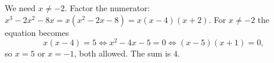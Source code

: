 We need $x\ne-2$. Factor the numerator: $x^3-2x^2-8x=x\left(x^2-2x-8\right)=x(x-4)(x+2)$. For $x\ne-2$ the equation becomes
\[x(x-4)=5\iff x^2-4x-5=0\iff(x-5)(x+1)=0,\]
so $x=5$ or $x=-1$, both allowed. The sum is $\boxed{4}$.
